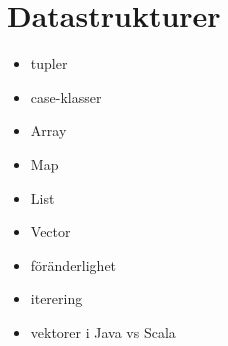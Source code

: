 \chapter{Datastrukturer}
\begin{itemize}[nosep]
\item tupler
\item case-klasser
\item Array
\item Map
\item List
\item Vector
\item föränderlighet
\item iterering
\item vektorer i Java vs Scala\end{itemize}